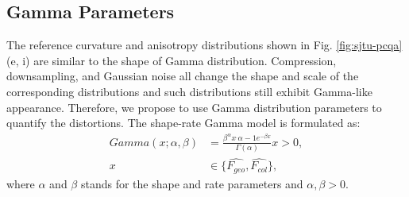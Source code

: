 \documentclass[lettersize,journal]{IEEEtran}
\begin{document}
\subsection{Gamma Parameters}
The reference curvature and anisotropy distributions shown in Fig. \ref{fig:sjtu-pcqa} (e, i) are similar to the shape of Gamma distribution. Compression, downsampling, and Gaussian noise all change the shape and scale of the corresponding distributions and such distributions still exhibit Gamma-like appearance. Therefore, we propose to use Gamma distribution parameters to quantify the distortions. The shape-rate Gamma model is formulated as:
\begin{equation}
\begin{aligned}
    Gamma(x ; \alpha, \beta)& =\frac{\beta^{\alpha} x^.{\alpha-1} e^{-\beta x}}{\Gamma(\alpha)} x>0,\\
    x & \in \{\hat{F_{geo}}, \hat{F_{col}}\},
\end{aligned}
    \label{equ:gamma}
\end{equation}
where $\alpha$ and $\beta$ stands for the shape and rate parameters and $\alpha, \beta>0$. 
\end{document}
